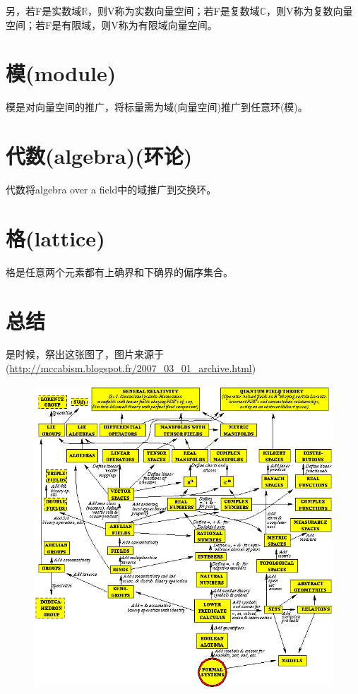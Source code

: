 \documentclass[12pt]{article}
\begin{document}
另，若F是实数域$\mathbb{R}$，则V称为实数向量空间；若F是复数域$\mathbb{C}$，则V称为复数向量空间；若F是有限域，则V称为有限域向量空间。

\section{模(module)}
模是对向量空间的推广，将标量需为域(向量空间)推广到任意环(模)。

\section{代数(algebra)(环论)}
代数将algebra over a field中的域推广到交换环。

\section{格(lattice)}
格是任意两个元素都有上确界和下确界的偏序集合。

\section{总结}
是时候，祭出这张图了，图片来源于(\url{http://mccabism.blogspot.fr/2007_03_01_archive.html})
\begin{figure}[H]
    \centering
    \includegraphics[width=1.0\textwidth]{fig/AbstractAlgebraRelations.png}
\end{figure}



\end{document}
